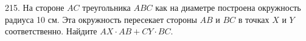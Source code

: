 215. На стороне  $AC$ треугольника  $ABC$ как на диаметре построена окружность радиуса 10 см. Эта
окружность пересекает стороны  $AB$ и  $BC$ в точках  $X$ и  $Y$ соответственно. Найдите  $AX\cdot AB + CY\cdot BC.$
\newpage
